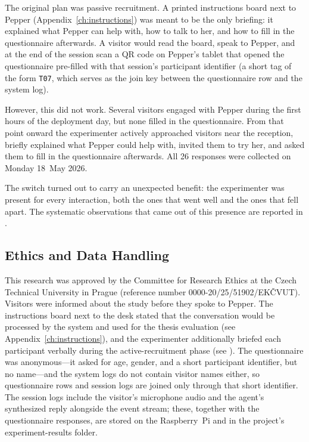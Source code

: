 The original plan was passive recruitment.
A printed instructions board next to Pepper (Appendix~\ref{ch:instructions}) was meant to be the only briefing: it explained what Pepper can help with, how to talk to her, and how to fill in the questionnaire afterwards.
A visitor would read the board, speak to Pepper, and at the end of the session scan a QR code on Pepper's tablet that opened the questionnaire pre-filled with that session's participant identifier (a short tag of the form \texttt{T07}, which serves as the join key between the questionnaire row and the system log).

However, this did not work.
Several visitors engaged with Pepper during the first hours of the deployment day, but none filled in the questionnaire.
From that point onward the experimenter actively approached visitors near the reception, briefly explained what Pepper could help with, invited them to try her, and asked them to fill in the questionnaire afterwards. All 26 responses were collected on Monday 18~May 2026.

The switch turned out to carry an unexpected benefit: the experimenter was present for every interaction, both the ones that went well and the ones that fell apart.
The systematic observations that came out of this presence are reported in .


\subsection{Ethics and Data Handling}
\label{sec:exp_ethics}

This research was approved by the Committee for Research Ethics at the Czech Technical University in Prague (reference number 0000-20/25/51902/EKČVUT).
Visitors were informed about the study before they spoke to Pepper.
The instructions board next to the desk stated that the conversation would be processed by the system and used for the thesis evaluation (see Appendix~\ref{ch:instructions}), and the experimenter additionally briefed each participant verbally during the active-recruitment phase (see ).
The questionnaire was anonymous---it asked for age, gender, and a short participant identifier, but no name---and the system logs do not contain visitor names either, so questionnaire rows and session logs are joined only through that short identifier.
The session logs include the visitor's microphone audio and the agent's synthesized reply alongside the event stream; these, together with the questionnaire responses, are stored on the Raspberry~Pi and in the project's experiment-results folder.

